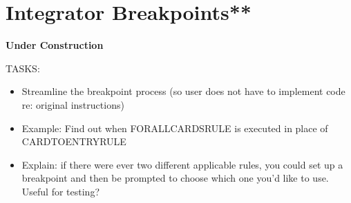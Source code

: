 \newpage
\section{Integrator Breakpoints**}
\genHeader

{\bf Under Construction}

\vspace{0.5cm}

TASKS:

\begin{itemize}
  \item Streamline the breakpoint process (so user does not have to implement code re: original instructions)
  
  \item Example: Find out when FORALLCARDSRULE is executed in place of CARDTOENTRYRULE
  
  \item Explain: if there were ever two different applicable rules, you could set up a breakpoint and then be prompted to choose which one you'd like to use.
  Useful for testing?

\end{itemize}
